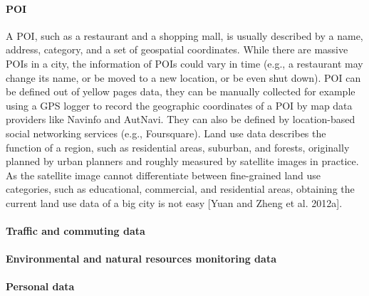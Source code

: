  \paragraph{POI} 
 A POI, such as a restaurant and a shopping mall, is usually described by a name, address, category, and a set of geospatial coordinates. While there are massive POIs in a city, the information of POIs could vary in time (e.g., a restaurant may change its name, or be moved to a new location, or be even shut down). POI can be defined out of yellow pages data, they can be manually collected for example using a GPS logger to record the geographic coordinates of a POI by map data providers like Navinfo and AutNavi. They can also be defined by location-based social networking services (e.g., Foursquare). Land use data describes the function of a region, such as residential areas, suburban, and forests, originally planned by urban planners and roughly measured by satellite images in practice. As the satellite image cannot differentiate between fine-grained land use categories, such as educational, commercial, and residential areas, obtaining the current land use data of a big city is not easy [Yuan and Zheng et al. 2012a].
 
 \paragraph{Traffic and commuting data} 


 \paragraph{Environmental and natural resources monitoring data} 

 \paragraph{Personal data} 

